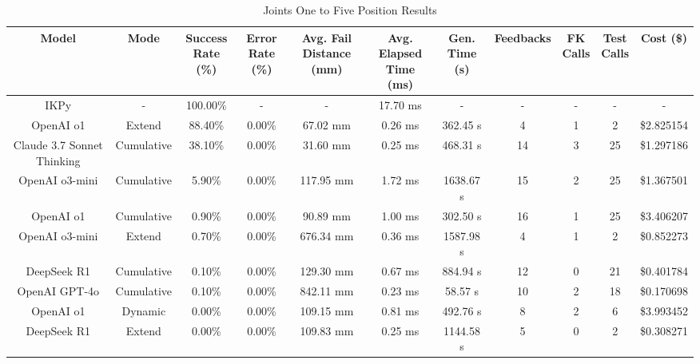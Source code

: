 \begin{landscape}
\begin{table}[H]
\tiny
\renewcommand{\arraystretch}{1.2}
\caption{Joints One to Five Position Results}
\begin{center}
\begin{tabular}{|c|c|c|c|c|c|c|c|c|c|c|}
    \hline
    \textbf{Model} & 
    \textbf{Mode} & 
    \makecell{\textbf{Success}\\\textbf{Rate (\%)}} &
    \makecell{\textbf{Error}\\\textbf{Rate (\%)}} &
    \makecell{\textbf{Avg. Fail}\\\textbf{Distance (mm)}} &
    \makecell{\textbf{Avg. Elapsed}\\\textbf{Time (ms)}} &
    \makecell{\textbf{Gen.}\\\textbf{Time (s)}} &
    \textbf{Feedbacks} &
    \makecell{\textbf{FK}\\\textbf{Calls}} &
    \makecell{\textbf{Test}\\\textbf{Calls}} &
    \textbf{Cost (\$)} \\
    \hline
    IKPy & - & 100.00\% & - & - & 17.70 ms & - & - & - & - & - \\
    \hline
    OpenAI o1 & Extend & 88.40\% & 0.00\% & 67.02 mm & 0.26 ms & 362.45 s & 4 & 1 & 2 & \$2.825154 \\
    \hline
    Claude 3.7 Sonnet Thinking & Cumulative & 38.10\% & 0.00\% & 31.60 mm & 0.25 ms & 468.31 s & 14 & 3 & 25 & \$1.297186 \\
    \hline
    OpenAI o3-mini & Cumulative & 5.90\% & 0.00\% & 117.95 mm & 1.72 ms & 1638.67 s & 15 & 2 & 25 & \$1.367501 \\
    \hline
    OpenAI o1 & Cumulative & 0.90\% & 0.00\% & 90.89 mm & 1.00 ms & 302.50 s & 16 & 1 & 25 & \$3.406207 \\
    \hline
    OpenAI o3-mini & Extend & 0.70\% & 0.00\% & 676.34 mm & 0.36 ms & 1587.98 s & 4 & 1 & 2 & \$0.852273 \\
    \hline
    DeepSeek R1 & Cumulative & 0.10\% & 0.00\% & 129.30 mm & 0.67 ms & 884.94 s & 12 & 0 & 21 & \$0.401784 \\
    \hline
    OpenAI GPT-4o & Cumulative & 0.10\% & 0.00\% & 842.11 mm & 0.23 ms & 58.57 s & 10 & 2 & 18 & \$0.170698 \\
    \hline
    OpenAI o1 & Dynamic & 0.00\% & 0.00\% & 109.15 mm & 0.81 ms & 492.76 s & 8 & 2 & 6 & \$3.993452 \\
    \hline
    DeepSeek R1 & Extend & 0.00\% & 0.00\% & 109.83 mm & 0.25 ms & 1144.58 s & 5 & 0 & 2 & \$0.308271 \\

\end{tabular}
\end{center}
\end{table}
\end{landscape}
